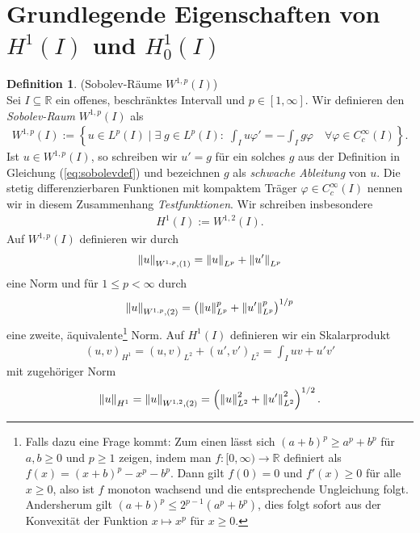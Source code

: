 \documentclass[twoside]{article}
\theoremstyle{definition}
\newtheorem{definition}[theorem]{Definition}
\begin{document}
\section{Grundlegende Eigenschaften von $H^1(I)$ und $H^1_0(I)$}
\begin{definition}(Sobolev-Räume $W^{1,p}(I)$)\\
Sei $I \subseteq \mathbb{R}$ ein offenes, beschränktes Intervall und $p \in [1,\infty]$. Wir definieren den \textit{Sobolev-Raum} $W^{1,p}(I)$ als
\begin{align}
W^{1,p}(I) := \left\{u \in L^p(I) \; \mathrel{\Big|} \; \exists \; g \in L^p(I): \; \int_I u \varphi' = - \int_I g \varphi \quad \forall \varphi \in C_c^\infty(I) \right\}. \label{eq:sobolevdef}
\end{align}
Ist $u \in W^{1,p}(I)$, so schreiben wir $u' = g$ für ein solches $g$ aus der Definition in Gleichung (\ref{eq:sobolevdef}) und bezeichnen $g$ als \textit{schwache Ableitung} von $u$. Die stetig differenzierbaren Funktionen mit kompaktem Träger $\varphi \in C_c^\infty(I)$ nennen wir in diesem Zusammenhang \textit{Testfunktionen}. Wir schreiben insbesondere
\begin{align}
H^1(I) := W^{1,2}(I).
\end{align}
Auf $W^{1,p}(I)$ definieren wir durch
\begin{align}
\norm{u}_{W^{1,p},(1)} = \norm{u}_{L^p} +  \norm{u'}_{L^p}
\end{align}
eine Norm und für $1 \leq p < \infty$ durch
\begin{align}
\norm{u}_{W^{1,p},(2)} = \left(\norm{u}_{L^p}^p +  \norm{u'}_{L^p}^p\right)^{1/p}
\end{align}
eine zweite, äquivalente\footnote{Falls dazu eine Frage kommt: Zum einen lässt sich $(a+b)^p \geq a^p + b^p$ für $a,b \geq 0$ und $p \geq 1$ zeigen, indem man $f:[0,\infty) \to \mathbb{R}$ definiert als $f(x)=(x+b)^p -x^p - b^p$. Dann gilt $f(0)=0$ und $f'(x) \geq 0$ für alle $x \geq 0$, also ist $f$ monoton wachsend und die entsprechende Ungleichung folgt. Andersherum gilt $(a+b)^p \leq 2^{p-1} (a^p + b^p)$, dies folgt sofort aus der Konvexität der Funktion $x \mapsto x^p$ für $x \geq 0$.} Norm. Auf $H^1(I)$ definieren wir ein Skalarprodukt
\begin{align}
(u,v)_{H^1} = (u,v)_{L^2} + (u',v')_{L^2} = \int_I uv + u'v'
\end{align}
mit zugehöriger Norm
\begin{align}
\norm{u}_{H^1} = \norm{u}_{W^{1,2},(2)} = \left(\norm{u}_{L^2}^2 + \norm{u'}_{L^2}^2 \right)^{1/2}.
\end{align}
\end{definition}
\end{document}
